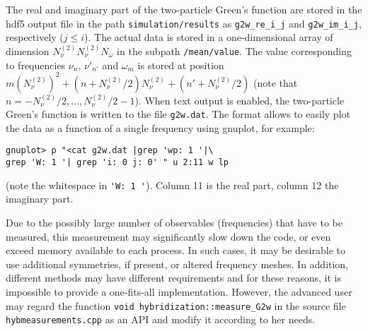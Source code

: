 \documentclass[aps,prb,floatfix,superscriptaddress,twocolumn,notitlepage]{revtex4-1}
\begin{document}
The real and imaginary part of the two-particle Green's function are stored in the hdf5 output file in the path \verb#simulation/results# as \verb#g2w_re_i_j# and \verb#g2w_im_i_j#, respectively ($j\leq i$). The actual data is stored in a one-dimensional array of dimension $N^{(2)}_{\nu}N^{(2)}_{\nu}N_{\omega}$  in the subpath \verb#/mean/value#. The value corresponding to frequencies $\nu_{n}$, $\nu'_{n'}$ and $\omega_{m}$ is stored at position $m(N^{(2)}_\nu)^{2} + (n+N^{(2)}_{\nu}/2)N^{(2)}_{\nu} + (n'+N^{(2)}_{\nu}/2)$ (note that $n=-N^{(2)}_{\nu}/2,\ldots, N^{(2)}_{\nu}/2-1$). When text output is enabled, the two-particle Green's function is written to the file \verb#g2w.dat#. The format allows to easily plot the data as a function of a single frequency using gnuplot, for example:
\begin{verbatim}
gnuplot> p "<cat g2w.dat |grep 'wp: 1 '|\
grep 'W: 1 '| grep 'i: 0 j: 0' " u 2:11 w lp
\end{verbatim}
(note the whitespace in \verb#'W: 1 '#). Column 11 is the real part, column 12 the imaginary part. 

Due to the possibly large number of observables (frequencies) that have to be measured, this measurement may significantly slow down the code, or even exceed memory available to each process. In such cases, it may be desirable to use additional symmetries, if present, or altered frequency meshes.
In addition, different methods may have different requirements and for these reasons, it is impossible to provide a one-fits-all implementation. However, the advanced user may regard the function \verb#void hybridization::measure_G2w# in the source file \verb#hybmeasurements.cpp# as an API and modify it according to her needs.
\end{document}
